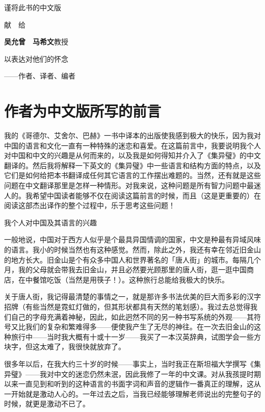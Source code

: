 \documentclass[
  12pt,
  twoside,
  openright,
  oldfontcommands,
]{memoir}
\begin{document}
\label{Dedicate.xhtml}{}

\hfill\break
\hfill\break

谨将此书的中文版

献　给

\textbf{吴允曾　马希文}教授

以表达对他们的怀念

------作者、译者、编者

\label{Preface1.xhtml}{}

\chapter*{作者为中文版所写的前言}

我的《哥德尔、艾舍尔、巴赫》一书中译本的出版使我感到极大的快乐，因为我对中国的语言和文化一直有一种特殊的迷恋和喜爱。在这篇前言中，我要说明我个人对中国和中文的兴趣是从何而来的，以及我是如何得知并介入了《集异璧》的中文翻译的。然后我将解释一下英文的《集异璧》中一些语言和结构方面的特点，以及它们是如何给把本书翻译成任何其它语言的工作摆出难题的。当然，还有就是这些问题在中文翻译那里是怎样一种情形。对我来说，这种问题是所有智力问题中最迷人的。我希望中国读者能够不仅在阅读这篇前言的时候，而且（这是更重要的）在阅读这部杰出译作的整个过程中，乐于思考这些问题！

{我个人对}中国及其语言的兴趣

一般地说，中国对于西方人似乎是个最具异国情调的国家，中文是种最有异域风味的语言。我小的时候当然也有这种感觉。然而，除此之外，我还有幸在邻近旧金山的地方长大。旧金山是个有众多中国人和世界著名的「唐人街」的城市。每隔几个月，我的父母就会带我去旧金山，并且必然要光顾那里的唐人街，逛一逛中国商店，在中餐馆吃饭（当然是用筷子！）。这种旅行总能给我极大的快乐。

关于唐人街，我记得最清楚的事情之一，就是那许多书法优美的巨大而多彩的汉字招牌（有些当然是霓虹灯做的，但其形状都具有天然的笔划感）。我过去总觉得我们自己的字母充满着神秘，因此，如此迥然不同的另一种书写系统的外观------其符号又比我们的复杂和繁难得多------便使我产生了无尽的神往。在一次去旧金山的这种旅行中------当时我大概有十或十一岁------我买了一本汉英辞典，试图学会一些方块字，但这太难了，我很快就放弃了。

很多年以后，在我大约三十岁的时候------事实上，当时我正在斯坦福大学撰写《集异璧》------我对中文的迷恋仍然未泯，因此我修了一年的中文课。对从我孩提时期以来一直见到和听到的这种语言的书面字词和声音的逻辑作一番真正的理解，这从一开始就是激动人心的。一年过去之后，当我已经能够理解老师说出的完整句子的时候，就更是激动不已了。
\end{document}
